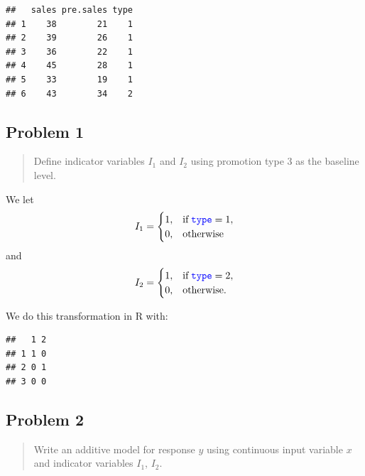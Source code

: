 \documentclass[
]{article}
\newenvironment{Shaded}{\begin{snugshade}}{\end{snugshade}}
\newcommand{\AttributeTok}[1]{\textcolor[rgb]{0.13,0.29,0.53}{#1}}
\newcommand{\DecValTok}[1]{\textcolor[rgb]{0.00,0.00,0.81}{#1}}
\newcommand{\FunctionTok}[1]{\textcolor[rgb]{0.13,0.29,0.53}{\textbf{#1}}}
\newcommand{\NormalTok}[1]{#1}
\newcommand{\OtherTok}[1]{\textcolor[rgb]{0.56,0.35,0.01}{#1}}
\newcommand{\SpecialCharTok}[1]{\textcolor[rgb]{0.81,0.36,0.00}{\textbf{#1}}}
\begin{document}
\begin{verbatim}
##   sales pre.sales type
## 1    38        21    1
## 2    39        26    1
## 3    36        22    1
## 4    45        28    1
## 5    33        19    1
## 6    43        34    2
\end{verbatim}

\hypertarget{problem-1}{%
\subsection{Problem 1}\label{problem-1}}

\begin{quote}
Define indicator variables \(I_1\) and \(I_2\) using promotion type 3 as
the baseline level.
\end{quote}

We let \[
  I_1 =
  \begin{cases}
    1, & \text{if} \;\textcolor{blue}{\texttt{type}} = 1,\\
    0, & \text{otherwise}
  \end{cases}
\] and \[
  I_2 =
  \begin{cases}
    1, & \text{if} \;\textcolor{blue}{\texttt{type}} = 2,\\
    0, & \text{otherwise}.
  \end{cases}
\]

We do this transformation in R with:

\begin{Shaded}
\end{Shaded}

\begin{verbatim}
##   1 2
## 1 1 0
## 2 0 1
## 3 0 0
\end{verbatim}

\hypertarget{problem-2}{%
\subsection{Problem 2}\label{problem-2}}

\begin{quote}
Write an additive model for response \(y\) using continuous input
variable \(x\) and indicator variables \(I_1\), \(I_2\).
\end{quote}
\end{document}
